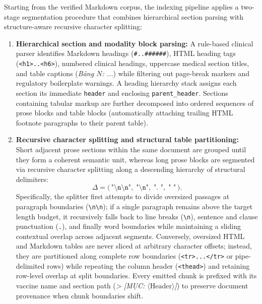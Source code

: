\documentclass[sn-mathphys, oneside]{sn-jnl}
\newcommand{\vn}[1]{{\fontencoding{T5}\selectfont #1}}
\begin{document}
Starting from the verified Markdown corpus, the indexing pipeline applies a two-stage segmentation procedure that combines hierarchical section parsing with structure-aware recursive character splitting:
\begin{enumerate}
\item \textbf{Hierarchical section and modality block parsing:} A rule-based clinical parser identifies Markdown headings (\texttt{\#..\#\#\#\#\#\#}), HTML heading tags (\texttt{<h1>..<h6>}), numbered clinical headings, uppercase medical section titles, and table captions (\emph{\vn{Bảng $N$: ...}}) while filtering out page-break markers and regulatory boilerplate warnings. A heading hierarchy stack assigns each section its immediate \texttt{header} and enclosing \texttt{parent\_header}. Sections containing tabular markup are further decomposed into ordered sequences of prose blocks and table blocks (automatically attaching trailing HTML footnote paragraphs to their parent table).
\item \textbf{Recursive character splitting and structural table partitioning:} Short adjacent prose sections within the same document are grouped until they form a coherent semantic unit, whereas long prose blocks are segmented via recursive character splitting along a descending hierarchy of structural delimiters:
\[
\Delta = \bigl(\,\texttt{"\textbackslash n\textbackslash n"},\; \texttt{"\textbackslash n"},\; \texttt{". "},\; \texttt{" "}\,\bigr).
\]
Specifically, the splitter first attempts to divide oversized passages at paragraph boundaries (\texttt{\textbackslash n\textbackslash n}); if a single paragraph remains above the target length budget, it recursively falls back to line breaks (\texttt{\textbackslash n}), sentence and clause punctuation (\texttt{.}), and finally word boundaries while maintaining a sliding contextual overlap across adjacent segments. Conversely, oversized HTML and Markdown tables are never sliced at arbitrary character offsets; instead, they are partitioned along complete row boundaries (\texttt{<tr>...</tr>} or pipe-delimited rows) while repeating the column header (\texttt{<thead>}) and retaining row-level overlap at split boundaries. Every emitted chunk is prefixed with its vaccine name and section path (\emph{\vn{[CHỦ ĐỀ: $\langle\text{Vaccine}\rangle$] > [MỤC: $\langle\text{Header}\rangle$]}}) to preserve document provenance when chunk boundaries shift.
\end{enumerate}
\end{document}

